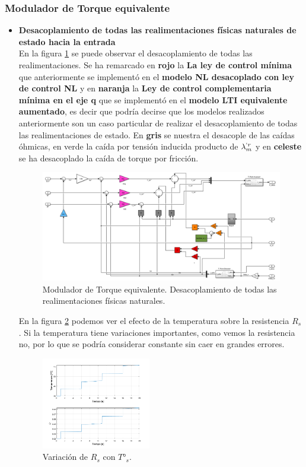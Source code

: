 \documentclass[10pt]{article}
\begin{document}
\subsubsection{Modulador de Torque equivalente}
\begin{itemize}
\item \textbf{Desacoplamiento de todas las realimentaciones físicas naturales de estado hacia la entrada}\\
	En la figura \ref{fig:Tmodulador} se puede observar el desacoplamiento de todas las realimentaciones.
	Se ha remarcado en \textbf{rojo} la \textbf{La ley de control mínima} que anteriormente se implementó en el \textbf{modelo NL desacoplado con ley de control NL} y en \textbf{naranja} la \textbf{Ley de control complementaria mínima en el eje q}  que se implementó en el \textbf{modelo LTI equivalente aumentado}, es decir que podría decirse que los modelos realizados anteriormente son un caso particular de realizar el desacoplamiento de todas las realimentaciones de estado.
	En \textbf{gris} se nuestra el desacople de las caídas óhmicas, en verde la caída por tensión inducida producto de $\lambda^{`r}_{m}$ y en \textbf{celeste} se ha desacoplado la caída de torque por fricción.

	\begin{figure}[h!]
	\centering
	\includegraphics[width=\textwidth]{modulador de torque.png}
	\caption{\label{fig:Tmodulador}Modulador de Torque equivalente. Desacoplamiento de todas las realimentaciones físicas naturales.}
	\end{figure}
	
	En la figura \ref{fig:Ts} podemos ver el efecto de la temperatura sobre la resistencia $R_{s}$. Si la temperatura tiene variaciones importantes, como vemos la resistencia no, por lo que se podría considerar constante sin caer en grandes errores. 
	
	\begin{figure}[h!]
	\centering
	\includegraphics[width=0.45\textwidth]{Ts.png}
	\caption{\label{fig:Ts}Variación de $R_{s}$ con $T°_{s}$.}
	\end{figure}


\end{itemize}
\end{document}
